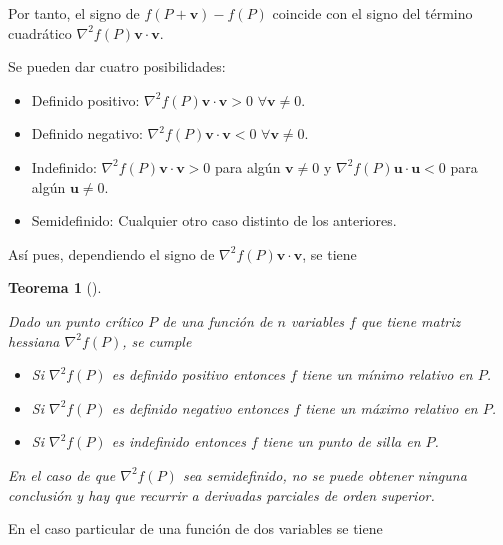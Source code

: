 \documentclass[
  a4paper,
]{scrreport}
\providecommand{\tightlist}{%
  \setlength{\itemsep}{0pt}\setlength{\parskip}{0pt}}\usepackage{longtable,booktabs,array}
\theoremstyle{definition}
\theoremstyle{plain}
\newtheorem{theorem}{Teorema}[chapter]
\theoremstyle{plain}
\theoremstyle{definition}
\theoremstyle{definition}
\theoremstyle{plain}
\theoremstyle{remark}
\begin{document}
Por tanto, el signo de \(f(P+\mathbf{v})-f(P)\) coincide con el signo
del término cuadrático \(\nabla^2f(P)\mathbf{v}\cdot\mathbf{v}\).

Se pueden dar cuatro posibilidades:

\begin{itemize}
\tightlist
\item
  Definido positivo: \(\nabla^2f(P)\mathbf{v}\cdot\mathbf{v}>0\)
  \(\forall \mathbf{v}\neq 0\).
\item
  Definido negativo: \(\nabla^2f(P)\mathbf{v}\cdot\mathbf{v}<0\)
  \(\forall \mathbf{v}\neq 0\).
\item
  Indefinido: \(\nabla^2f(P)\mathbf{v}\cdot\mathbf{v}>0\) para algún
  \(\mathbf{v}\neq 0\) y \(\nabla^2f(P)\mathbf{u}\cdot\mathbf{u}<0\)
  para algún \(\mathbf{u}\neq 0\).
\item
  Semidefinido: Cualquier otro caso distinto de los anteriores.
\end{itemize}

Así pues, dependiendo el signo de
\(\nabla^2f(P)\mathbf{v}\cdot\mathbf{v}\), se tiene

\begin{theorem}[]\protect\hypertarget{thm-extremos-funcion-varias-variables}{}\label{thm-extremos-funcion-varias-variables}

Dado un punto crítico \(P\) de una función de \(n\) variables \(f\) que
tiene matriz hessiana \(\nabla^2 f(P)\), se cumple

\begin{itemize}
\tightlist
\item
  Si \(\nabla^2f(P)\) es definido positivo entonces \(f\) tiene un
  \emph{mínimo relativo} en \(P\).
\item
  Si \(\nabla^2f(P)\) es definido negativo entonces \(f\) tiene un
  \emph{máximo relativo} en \(P\).
\item
  Si \(\nabla^2f(P)\) es indefinido entonces \(f\) tiene un \emph{punto
  de silla} en \(P\).
\end{itemize}

En el caso de que \(\nabla^2f(P)\) sea semidefinido, no se puede obtener
ninguna conclusión y hay que recurrir a derivadas parciales de orden
superior.

\end{theorem}

En el caso particular de una función de dos variables se tiene
\end{document}
